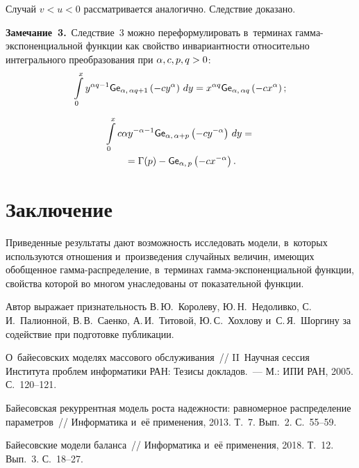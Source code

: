 \begin{multicols}{2}
Случай $v<u<0$ рассматривается аналогично.
Следствие доказано.

\bigskip

\noindent
\textbf{Замечание~3.}\
Следствие~3 можно переформулировать в~терминах 
гам\-ма-экс\-по\-нен\-ци\-аль\-ной функции как свойство инвариантности относительно 
интегрального преобразования при
$\alpha,c,p,q\hm>0$:
$$
\int\limits_0^x
{y^{\alpha q-1}}{\sf Ge}_{\alpha,\, \alpha q+1}\left(-{c y}^{\alpha}\right)
\, dy={x^{\alpha q}}{\sf Ge}_{\alpha,\,\alpha q}\left(-{c x}^\alpha\right);
$$

\vspace*{-12pt}


\noindent
\begin{multline*}
\int\limits_0^x
{c{\alpha}y^{-\alpha-1}}{\sf Ge}_{\alpha,\, \alpha+p}\left(-cy^{-\alpha}\right)
\, dy={}\\
{}=\Gamma(p)-{\sf Ge}_{\alpha,\,p}\left(-cx^{-\alpha}\right).
\end{multline*}

\section{Заключение}

Приведенные результаты дают возможность исследовать модели, в~которых 
используются отношения и~произведения случайных величин, имеющих обобщенное 
гам\-ма-рас\-пре\-де\-ле\-ние, в~терминах гам\-ма-экс\-по\-нен\-ци\-аль\-ной 
функции, свойства которой 
во многом унаследованы от показательной функции.

\bigskip

Автор выражает признательность В.\,Ю.~Королеву, Ю.\,Н.~Недоливко, 
С.\,И.~Палионной, В.\,В.~Саенко, А.\,И.~Титовой, Ю.\,С.~Хохлову и~С.\,Я.~Шоргину 
за содействие при подготовке публикации.

{\small\frenchspacing
 {%
 \begin{thebibliography}{99}
О~байесовских моделях массового обслуживания~// 
II~Научная сессия Института проблем информатики РАН: Тезисы докладов.~--- 
М.: ИПИ РАН, 2005. С.~120--121.

 Байесовская
рекуррентная модель роста надежности: равномерное распределение
параметров~// Информатика и~её применения, 2013. Т.~7. Вып.~2.
С.~55--59.

Байесовские модели баланса~// Информатика и~её применения, 2018. Т.~12. Вып.~3. С.~18--27.


\end{thebibliography}}}
\end{multicols}
